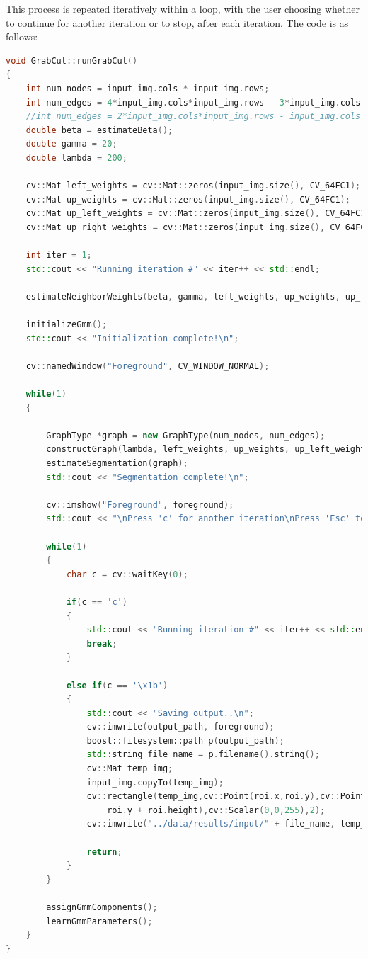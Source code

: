 \documentclass[a4paper,11]{article}
\begin{document}
  This process is repeated iteratively within a loop, with the user choosing whether to continue for another iteration or to stop, after each iteration. The code is as follows:
  
    \begin{lstlisting}[language=C++]
void GrabCut::runGrabCut()
{
	int num_nodes = input_img.cols * input_img.rows;
	int num_edges = 4*input_img.cols*input_img.rows - 3*input_img.cols -3*input_img.rows + 2;
	//int num_edges = 2*input_img.cols*input_img.rows - input_img.cols - input_img.rows;
	double beta = estimateBeta();
	double gamma = 20;
	double lambda = 200;

	cv::Mat left_weights = cv::Mat::zeros(input_img.size(), CV_64FC1);
	cv::Mat up_weights = cv::Mat::zeros(input_img.size(), CV_64FC1);
	cv::Mat up_left_weights = cv::Mat::zeros(input_img.size(), CV_64FC1);
	cv::Mat up_right_weights = cv::Mat::zeros(input_img.size(), CV_64FC1);

	int iter = 1;
	std::cout << "Running iteration #" << iter++ << std::endl;

	estimateNeighborWeights(beta, gamma, left_weights, up_weights, up_left_weights, up_right_weights);

	initializeGmm();
	std::cout << "Initialization complete!\n";

	cv::namedWindow("Foreground", CV_WINDOW_NORMAL);

	while(1)	
	{

		GraphType *graph = new GraphType(num_nodes, num_edges);
		constructGraph(lambda, left_weights, up_weights, up_left_weights, up_right_weights, graph);
		estimateSegmentation(graph);
		std::cout << "Segmentation complete!\n";

		cv::imshow("Foreground", foreground);
		std::cout << "\nPress 'c' for another iteration\nPress 'Esc' to save output and exit\n\n";

		while(1)
		{
			char c = cv::waitKey(0);

			if(c == 'c')
			{
				std::cout << "Running iteration #" << iter++ << std::endl;
				break;
			}

			else if(c == '\x1b')
			{
				std::cout << "Saving output..\n";
				cv::imwrite(output_path, foreground);
				boost::filesystem::path p(output_path);
				std::string file_name = p.filename().string();
				cv::Mat temp_img;
				input_img.copyTo(temp_img);
				cv::rectangle(temp_img,cv::Point(roi.x,roi.y),cv::Point(roi.x + roi.width,
					roi.y + roi.height),cv::Scalar(0,0,255),2);
				cv::imwrite("../data/results/input/" + file_name, temp_img);

				return;
			}
		}

		assignGmmComponents();
		learnGmmParameters();
	}
}
    \end{lstlisting}
    \vspace{2em}
    
\end{document}
